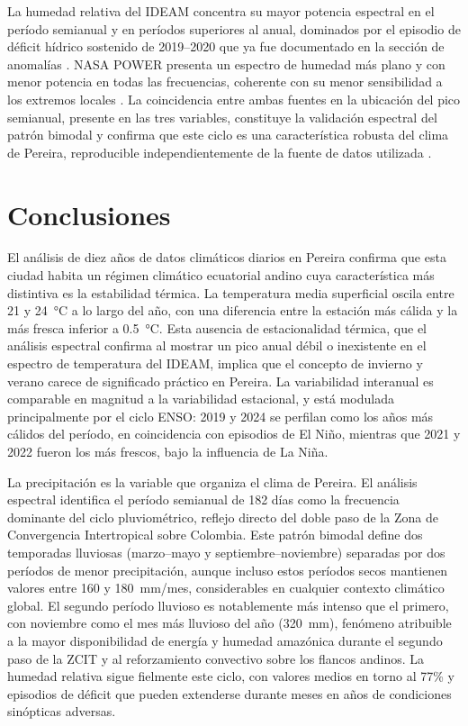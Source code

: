 \documentclass[12pt, a4paper]{article}
\begin{document}
La humedad relativa del IDEAM concentra su mayor potencia espectral en el período
semianual y en períodos superiores al anual, dominados por el episodio de déficit
hídrico sostenido de 2019--2020 que ya fue documentado en la sección de anomalías
\cite{ideam2019nino}. NASA POWER presenta un espectro de humedad más plano y con
menor potencia en todas las frecuencias, coherente con su menor sensibilidad a los
extremos locales \cite{gelaro2017}. La coincidencia entre ambas fuentes en la
ubicación del pico semianual, presente en las tres variables, constituye la
validación espectral del patrón bimodal y confirma que este ciclo es una
característica robusta del clima de Pereira, reproducible independientemente de
la fuente de datos utilizada \cite{urrea2019, poveda2005}.

\section{Conclusiones}

El análisis de diez años de datos climáticos diarios en Pereira confirma que esta
ciudad habita un régimen climático ecuatorial andino cuya característica más
distintiva es la estabilidad térmica. La temperatura media superficial oscila entre
21 y 24~°C a lo largo del año, con una diferencia entre la estación más cálida y
la más fresca inferior a 0.5~°C. Esta ausencia de estacionalidad térmica, que el
análisis espectral confirma al mostrar un pico anual débil o inexistente en el
espectro de temperatura del IDEAM, implica que el concepto de invierno y verano
carece de significado práctico en Pereira. La variabilidad interanual es comparable
en magnitud a la variabilidad estacional, y está modulada principalmente por el
ciclo ENSO: 2019 y 2024 se perfilan como los años más cálidos del período, en
coincidencia con episodios de El Niño, mientras que 2021 y 2022 fueron los más
frescos, bajo la influencia de La Niña.

La precipitación es la variable que organiza el clima de Pereira. El análisis
espectral identifica el período semianual de 182 días como la frecuencia dominante
del ciclo pluviométrico, reflejo directo del doble paso de la Zona de Convergencia
Intertropical sobre Colombia. Este patrón bimodal define dos temporadas lluviosas
(marzo--mayo y septiembre--noviembre) separadas por dos períodos de menor
precipitación, aunque incluso estos períodos secos mantienen valores entre 160 y
180~mm/mes, considerables en cualquier contexto climático global. El segundo período
lluvioso es notablemente más intenso que el primero, con noviembre como el mes más
lluvioso del año (320~mm), fenómeno atribuible a la mayor disponibilidad de energía
y humedad amazónica durante el segundo paso de la ZCIT y al reforzamiento convectivo
sobre los flancos andinos. La humedad relativa sigue fielmente este ciclo, con
valores medios en torno al 77\% y episodios de déficit que pueden extenderse durante
meses en años de condiciones sinópticas adversas.
\end{document}
